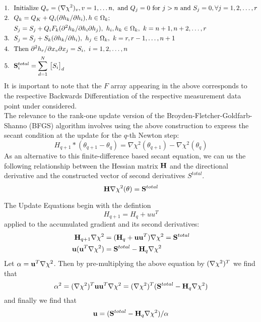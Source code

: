 \begin{align*}
1.~~ & \hbox{Initialize } Q_v = (\nabla\chi^2)_v, v =1,\hdots n, \hbox{ and } Q_j = 0 \hbox{ for $  j>n$ and } S_j = 0, \forall j = 1,2, \hdots, r\\
2.~~ & Q_k = Q_K + Q_i (\partial h_k/ \partial h_i), h \in \Omega_k; \\
        & S_j = S_j + Q_i F_k (\partial^2 h_k/\partial h_i \partial h_j), ~ h_i, h_k \in \Omega_k, ~ k = n+1, n+2, \hdots, r\\ 
3.~~ & S_j = S_j + S_k (\partial h_k/\partial h_i), ~h_j \in \Omega_k,~ k = r, r-1, \hdots, n+1\\
4.~~ & \hbox{Then } \partial^2 h_r/\partial x_v \partial x_j = S_i, ~ i = 1,2,\hdots,n\\
5.~~ &{\bf S}_i^{total} = \sum_{d=1}^N\, \big[ S_i\big]_d
\end{align*}It is important to note that the $F$ array appearing in the above corresponds to the respective Backwards Differentiation of the respective measurement data point under considered.\\

The relevance to the rank-one update version of the Broyden-Fletcher-Goldfarb-Shanno (BFGS) algorithm involves using the above construction to express the secant condition at the update for the $q$-th Newton step: 
$$H_{q+1}*(\theta_{q+1} - \theta_q) = \nabla \chi^2(\theta_{q+1}) - \nabla \chi^2(\theta_q) $$As an alternative to this finite-difference based secant equation, we can us the following relationship between the Hessian matrix $\bf H$ and the directional derivative and the constructed vector of second derivatives $S^{total}$.
$${\bf H \nabla} \chi^2(\theta)  = {\bf S}^{total} $$

The Update Equations begin with the defintion $$H_{q+1} = H_q + uu^T$$ applied to the accumulated gradient and its second derivatives: 
\begin{align*}
{\bf H}_{q+1} \nabla \chi^2  &= ({\bf H}_q + {\bf uu}^T ) {\bf \nabla} \chi^2 =  {\bf S}^{total}\\
{\bf u}({\bf u}^T {\bf \nabla} \chi^2) &= {\bf S}^{total} - {\bf H}_q{\bf \nabla} \chi^2
\end{align*}Let $\alpha  = {\bf u}^T{\bf \nabla} \chi^2$. Then by pre-multiplying the above equation by $({\bf \nabla} \chi^2)^T$ we find that 
$$\alpha^2  = ({\bf \nabla} \chi^2)^T {\bf u u}^T{\bf \nabla} \chi^2  = ({\bf \nabla} \chi^2)^T ({\bf S}^{total} - {\bf H}_q{\bf \nabla} \chi^2)$$ and finally we find  that $$ {\bf u} = ({\bf S}^{total} - {\bf H}_q{\bf \nabla} \chi^2) / \alpha$$

